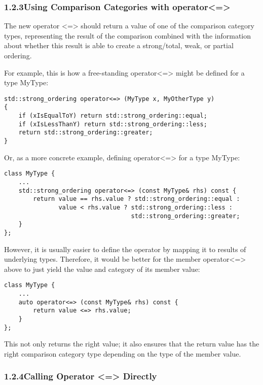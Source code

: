 \subsubsection*{ 1.2.3\hspace{0.2cm}Using Comparison Categories with operator<=>}

The new operator <=> should return a value of one of the comparison category types, representing the result of the comparison combined with the information about whether this result is able to create a strong/total, weak, or partial ordering.

For example, this is how a free-standing operator<=> might be defined for a type MyType:

\begin{lstlisting}[style=styleCXX]
std::strong_ordering operator<=> (MyType x, MyOtherType y)
{
	if (xIsEqualToY) return std::strong_ordering::equal;
	if (xIsLessThanY) return std::strong_ordering::less;
	return std::strong_ordering::greater;
}
\end{lstlisting}

Or, as a more concrete example, defining operator<=> for a type MyType:

\begin{lstlisting}[style=styleCXX]
class MyType {
	...
	std::strong_ordering operator<=> (const MyType& rhs) const {
		return value == rhs.value ? std::strong_ordering::equal :
			   value < rhs.value ? std::strong_ordering::less :
							       std::strong_ordering::greater;
	}
};
\end{lstlisting}

However, it is usually easier to define the operator by mapping it to results of underlying types. Therefore, it would be better for the member operator<=> above to just yield the value and category of its member value:

\begin{lstlisting}[style=styleCXX]
class MyType {
	...
	auto operator<=> (const MyType& rhs) const {
		return value <=> rhs.value;
	}
};
\end{lstlisting}

This not only returns the right value; it also ensures that the return value has the right comparison category type depending on the type of the member value.

\subsubsection*{ 1.2.4\hspace{0.2cm}Calling Operator <=> Directly}

